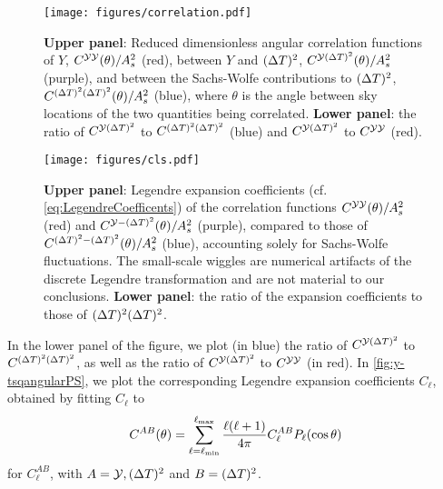 \documentclass[fleqn,usenatbib]{mnras}
\begin{document}
    \begin{figure}
        \centering
        \texttt{[image: figures/correlation.pdf]}
        \caption{%
            \textbf{Upper panel}: Reduced dimensionless angular correlation
            functions of $Y$, $C^{\mathcal{YY}}(\theta)/A_s^2$ (red), between $Y$
            and $({\Delta T})^2$, $C^{\mathcal{Y}({\Delta T})^2}(\theta)/A_s^2$ (purple), and
            between the Sachs-Wolfe contributions to $({\Delta T})^2$,
            $C^{({\Delta T})^2({\Delta T})^2}(\theta)/A_s^2$ (blue), where $\theta$ is
            the angle between sky locations of the two quantities being
            correlated.  \textbf{Lower panel}: the ratio of $C^{\mathcal{Y}({\Delta T})^2}$
            to $C^{({\Delta T})^2({\Delta T})^2}$ (blue) and $C^{\mathcal{Y}({\Delta T})^2}$ to
            $C^{\mathcal{Y}\mathcal{Y}}$ (red).
        }
        \label{fig:y-tsqcorrelation}
    \end{figure}
    \begin{figure}
        \texttt{[image: figures/cls.pdf]}
        \caption{%
            \textbf{Upper panel}: Legendre expansion coefficients (cf.
            \eqref{eq:LegendreCoefficents}) of the correlation functions
            $C^{\mathcal{YY}}(\theta)/A_s^2$ (red) and
            $C^{\mathcal{Y}-({\Delta T})^2}(\theta)/A_s^2$ (purple), compared to those of
            $C^{({\Delta T})^2-({\Delta T})^2}(\theta)/A_s^2$ (blue), accounting
            solely for Sachs-Wolfe fluctuations. The small-scale wiggles are
            numerical artifacts of the discrete Legendre transformation and are
            not material to our conclusions. \textbf{Lower panel}: the ratio of
            the expansion coefficients to those of $({\Delta T})^2({\Delta T})^2$.%
        }
        \label{fig:y-tsqangularPS}
    \end{figure}
    
    In the lower panel of the figure, we plot (in blue) the ratio of
    $C^{\mathcal{Y}({\Delta T})^2}$ to $C^{({\Delta T})^2(\Delta T)^2}$, as well as the ratio
    of $C^{\mathcal{Y}({\Delta T})^2}$ to $C^{\mathcal{Y}\mathcal{Y}}$ (in red).  In
    \autoref{fig:y-tsqangularPS}, we plot the corresponding Legendre expansion
    coefficients $C_\ell$, obtained by fitting $C_\ell$ to
    \begin{equation} \label{eq:LegendreCoefficents}
        C^{AB}(\theta) = \sum\limits_{\ell=\ell_{\rm min}}^{\ell_{\rm max}} 
            \frac{\ell(\ell+1)}{4\pi}C^{AB}_\ell P_\ell(\cos\theta)
    \end{equation}
    for $C^{AB}_\ell$, with $A=\mathcal{Y},({\Delta T})^2$ and $B=({\Delta T})^2$.
    
\end{document}
